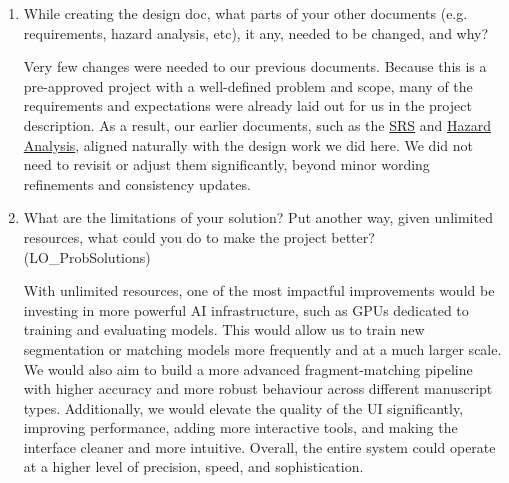 \documentclass[12pt, titlepage]{article}
\begin{document}
\begin{enumerate}
    \hspace{2em} Many of our design decisions, especially those involving the user interface, were directly influenced by conversations with our supervisor, Dr. Shayne. Since he does not come from a technical background, he primarily expressed his needs in terms of how he wanted to interact with the system. This naturally shaped the UI and the workflow we designed for scholars. Additionally, the inclusion of segmentation-based machine learning came from his explicit request; he emphasized that automated assistance in identifying and matching fragments would significantly improve his research workflow. These inputs helped anchor our design choices in real user needs.

  \item While creating the design doc, what parts of your other documents (e.g.
  requirements, hazard analysis, etc), it any, needed to be changed, and why?

    \hspace{2em} Very few changes were needed to our previous documents. Because this is a pre-approved project with a well-defined problem and scope, many of the requirements and expectations were already laid out for us in the project description. As a result, our earlier documents, such as the \href{https://github.com/DylanG5/sanskrit-ciphers-requirements}{SRS} and \href{https://github.com/DylanG5/sanskrit-cipher/blob/main/docs/HazardAnalysis/HazardAnalysis.pdf}{Hazard Analysis}, aligned naturally with the design work we did here. We did not need to revisit or adjust them significantly, beyond minor wording refinements and consistency updates.

  \item What are the limitations of your solution?  Put another way, given
  unlimited resources, what could you do to make the project better? (LO\_ProbSolutions)

    \hspace{2em} With unlimited resources, one of the most impactful improvements would be investing in more powerful AI infrastructure, such as GPUs dedicated to training and evaluating models. This would allow us to train new segmentation or matching models more frequently and at a much larger scale. We would also aim to build a more advanced fragment-matching pipeline with higher accuracy and more robust behaviour across different manuscript types. Additionally, we would elevate the quality of the UI significantly, improving performance, adding more interactive tools, and making the interface cleaner and more intuitive. Overall, the entire system could operate at a higher level of precision, speed, and sophistication.


\end{enumerate}
\end{document}
